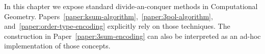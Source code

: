 In this chapter we expose standard divide-an-conquer methods in
Computational Geometry.
%
Papers~\ref{paper:ksum-algorithm},~\ref{paper:3pol-algorithm},
and~\ref{paper:order-type-encoding} explicitly rely on those techniques.
%
The construction in
Paper~\ref{paper:3sum-encoding} can also be interpreted as an ad-hoc
implementation of those concepts.






